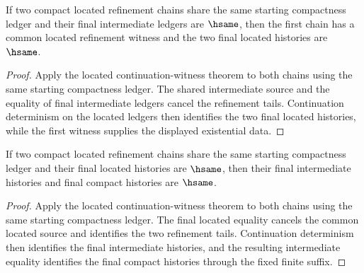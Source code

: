 \begin{theorem}
\label{thm:compact-located-refinement-chain-common-source-final-located-deterministic}
If two compact located refinement chains share the same starting compactness
ledger and their final intermediate ledgers are $\hsame$, then the first chain
has a common located refinement witness and the two final located histories are
$\hsame$.
\end{theorem}
\begin{proof}
Apply the located continuation-witness theorem to both chains using the same
starting compactness ledger. The shared intermediate source and the equality of
final intermediate ledgers cancel the refinement tails. Continuation
determinism on the located ledgers then identifies the two final located
histories, while the first witness supplies the displayed existential data.
\end{proof}

\begin{theorem}
\label{thm:compact-located-refinement-chain-common-source-final-located-tail-deterministic}
If two compact located refinement chains share the same starting compactness
ledger and their final located histories are $\hsame$, then their final
intermediate histories and final compact histories are $\hsame$.
\end{theorem}
\begin{proof}
Apply the located continuation-witness theorem to both chains using the same
starting compactness ledger. The final located equality cancels the common
located source and identifies the two refinement tails. Continuation
determinism then identifies the final intermediate histories, and the resulting
intermediate equality identifies the final compact histories through the fixed
finite suffix.
\end{proof}

